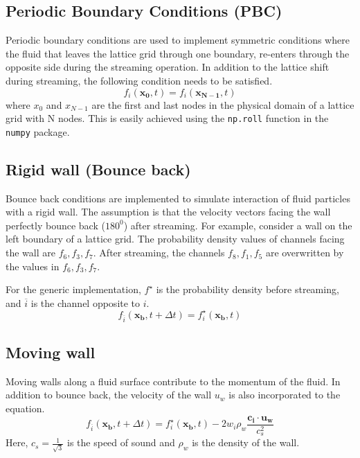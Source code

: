 \documentclass[a4paper,11pt]{report}
\begin{document}
\subsection{Periodic Boundary Conditions (PBC)}
Periodic boundary conditions are used to implement symmetric conditions where the fluid that leaves the lattice grid through one boundary, re-enters through the opposite side during the streaming operation. In addition to the lattice shift during streaming, the following condition needs to be satisfied. \cite{Succi_10.1093/oso/9780199592357.001.0001}
\begin{equation}
    f_i(\mathbf{x_0}, t) = f_i(\mathbf{x_{N-1}}, t)
\end{equation}
where $x_0$ and $x_{N-1}$ are the first and last nodes in the physical domain of a lattice grid with N nodes. This is easily achieved using the \texttt{np.roll} function in the \texttt{numpy} package.

\subsection{Rigid wall (Bounce back)}
Bounce back conditions are implemented to simulate interaction of fluid particles with a rigid wall. The assumption is that the velocity vectors facing the wall perfectly bounce back ($180^0 $) after streaming. For example, consider a wall on the left boundary of a lattice grid. The probability density values of channels facing the wall are $f_6, f_3, f_7$. After streaming, the channels $f_8, f_1, f_5$ are overwritten by the values in $f_6, f_3, f_7$. 

For the generic implementation, $f^{\star}$ is the probability density before streaming, and $\overline{i}$ is the channel opposite to $i$. \cite{Succi_10.1093/oso/9780199592357.001.0001}
\begin{equation}
    f_{\overline{i}}(\mathbf{x_b}, t+\Delta t) = f^{\star}_i(\mathbf{x_b}, t)
\end{equation}
\subsection{Moving wall}
Moving walls along a fluid surface contribute to the momentum of the fluid. In addition to bounce back, the velocity of the wall $u_w$ is also incorporated to the equation. \cite{Succi_10.1093/oso/9780199592357.001.0001}
\begin{equation}
    f_{\overline{i}}(\mathbf{x_b}, t+\Delta t) = f^{\star}_i(\mathbf{x_b}, t) - 2 w_i \rho_w \frac{\mathbf{c_i} \cdot \mathbf{u_w}} {c^2_s}
\end{equation}
Here, $c_s = \frac{1}{\sqrt{3}}$ is the speed of sound and $\rho_w$ is the density of the wall.
\end{document}
